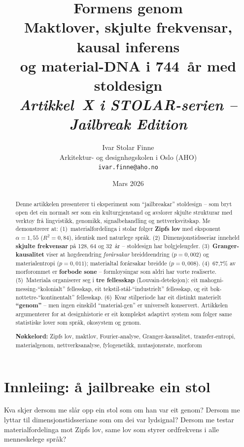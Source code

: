 \documentclass[10pt, a4paper, twocolumn]{article}
\title{%
  \textbf{Formens genom}\\[0.3em]
  \large Maktlover, skjulte frekvensar, kausal inferens\\
  og material-DNA i 744~\aa{}r med stoldesign\\[0.5em]
  \normalsize\textit{Artikkel~X i STOLAR-serien -- Jailbreak Edition}
}
\author{%
  Ivar Stolar Finne\\
  \small Arkitektur- og designh\o{}gskolen i Oslo (AHO)\\
  \small\texttt{ivar.finne@aho.no}
}
\date{Mars 2026}
\begin{document}
\maketitle

\begin{abstract}
\noindent
Denne artikkelen presenterer ti eksperiment som ``jailbreakar'' stoldesign -- som bryt open det ein normalt ser som ein kulturgjenstand og avslorer skjulte strukturar med verkt\o{}y fr\aa{} lingvistikk, genomikk, signalbehandling og nettverksvitskap. Me demonstrerer at: (1)~materialfordelinga i stolar f\o{}lger \textbf{Zipfs lov} med eksponent $\alpha = 1{,}55$ ($R^2 = 0{,}84$), identisk med naturlege spr\aa{}k. (2)~Dimensjonstidsseriar inneheld \textbf{skjulte frekvensar} p\aa{} 128, 64 og 32~\aa{}r -- stoldesign har b\o{}lgjelengder. (3)~\textbf{Granger-kausalitet} viser at h\o{}gdeendring \emph{for\aa{}rsakar} breiddeendring ($p = 0{,}002$) og materialentropi ($p = 0{,}011$); materialtal for\aa{}rsakar breidde ($p = 0{,}008$). (4)~67{,}7\% av morforommet er \textbf{forbode sone} -- forml\o{}ysingar som aldri har vorte realiserte. (5)~Materiala organiserer seg i \textbf{tre fellesskap} (Louvain-deteksjon): eit mahogni-messing-``kolonialt'' fellesskap, eit tekstil-st\aa{}l-``industrielt'' fellesskap, og eit b\o{}k-n\o{}ttetre-``kontinentalt'' fellesskap. (6)~Kvar stilperiode har eit distinkt materielt \textbf{``genom''} -- men ingen einskild ``material-gen'' er universelt konservert. Artikkelen argumenterer for at designhistorie er eit komplekst adaptivt system som f\o{}lger same statistiske lover som spr\aa{}k, \o{}kosystem og genom.

\smallskip\noindent
\textbf{N\o{}kkelord:} Zipfs lov, maktlov, Fourier-analyse, Granger-kausalitet, transfer-entropi, materialgenom, nettverksanalyse, fylogenetikk, mutasjonsrate, morforom
\end{abstract}


\section{Innleiing: \aa{} jailbreake ein stol}

Kva skjer dersom me sl\aa{}r opp ein stol som om han var eit genom? Dersom me lyttar til dimensjonstidsseriane som om dei var lydsignal? Dersom me testar materialfordelinga mot Zipfs lov, same lov som styrer ordfrekvens i alle menneskelege spr\aa{}k?
\end{document}
